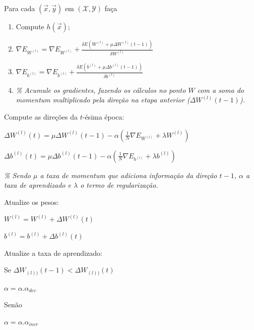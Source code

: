 \documentclass[12pt,a4paper,utf8]{ppgsi}
\begin{document}
\begin{algorithm}[htb]
\begin{algorithmic}
\STATE

\item \hspace{0.5cm} Para cada $\left( \vec{x}, \vec{y} \right)$ em $(\mathcal{X}, \mathcal{Y})$ faça

\begin{enumerate}
    \item \hspace{0.5cm} Compute $h(\vec{x})$;
    \item \hspace{0.5cm} $\nabla E_{W^{(l)}} = \nabla E_{W^{(l)}} + \frac{\delta E(W^{(l)} + \mu \Delta W^{(l)}(t-1))}{\delta W^{(l)}}$
    \item \hspace{0.5cm} $\nabla E_{b^{(l)}} = \nabla E_{b^{(l)}} + \frac{\delta E(b^{(l)} + \mu \Delta b^{(l)}(t-1))}{\delta b^{(l)}}$
    \item \hspace{1.5cm} {\it \footnotesize \% Acumule os gradientes, fazendo os cálculos no ponto $W$ com a soma do momentum multiplicado pela direção na etapa anterior ($\Delta W^{(l)}(t-1)$).}
\end{enumerate}

\item \hspace{0.5cm} Compute as direções da $t$-ésima época:
\item \hspace{0.8cm} $\Delta W^{(l)}(t) = \mu \Delta W^{(l)}(t-1) - \alpha (\frac{1}{N} \nabla E_{W^{(l)}} + \lambda W^{(l)})$
\item \hspace{0.8cm} $\Delta b^{(l)}(t) = \mu \Delta b^{(l)}(t-1) - \alpha (\frac{1}{N} \nabla E_{b^{(l)}} + \lambda b^{(l)})$
\item \hspace{1.3cm} {\it \footnotesize \% Sendo $\mu$ a taxa de momentum que adiciona informação da direção $t-1$, $\alpha$ a taxa de aprendizado e $\lambda$ o termo de regularização.}

\item \hspace{0.5cm} Atualize os pesos:
\item \hspace{0.8cm} $W^{(l)} = W^{(l)} + \Delta W^{(l)}(t)$
\item \hspace{0.8cm} $b^{(l)} = b^{(l)} + \Delta b^{(l)}(t)$

\item \hspace{0.5cm} Atualize a taxa de aprendizado:
\item \hspace{0.8cm} Se $\Delta W_{(l))}(t-1) < \Delta W_{(l))}(t)$
\item \hspace{1.3cm} $\alpha = \alpha . \alpha_{dec}$
\item \hspace{0.8cm} Senão
\item \hspace{1.3cm} $\alpha = \alpha . \alpha_{incr}$



\end{algorithmic}
\end{algorithm}
\end{document}
